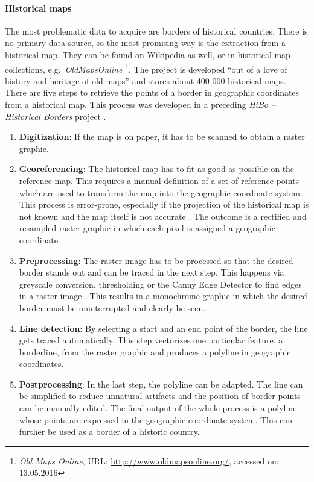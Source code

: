\paragraph{Historical maps} %
\label{par:historical_map}

The most problematic data to acquire are borders of historical countries. There is no primary data source, so the most promising way is the extraction from a historical map. They can be found on Wikipedia as well, or in historical map collections, e.g.\ \emph{OldMapsOnline}
\footnote{
  \textit{Old Maps Online},
  URL: \url{http://www.oldmapsonline.org/},
  accessed on: 13.05.2016
}.
The project is developed ``out of a love of history and heritage of old maps'' and stores about 400 000 historical maps.
There are five steps to retrieve the points of a border in geographic coordinates from a historical map. This process was developed in a preceding \emph{HiBo -- Historical Borders} project \cite{hibo}.

\begin{enumerate}
  \item \textbf{Digitization}: If the map is on paper, it has to be scanned to obtain a raster graphic.
  \item \textbf{Georeferencing}: The historical map has to fit as good as possible on the reference map. This requires a manual definition of a set of reference points which are used to transform the map into the geographic coordinate system. This process is error-prone, especially if the projection of the historical map is not known and the map itself is not accurate
  \cite{knowles2002past}.
  The outcome is a rectified and resampled raster graphic in which each pixel is assigned a geographic coordinate.
  \item \textbf{Preprocessing}: The raster image has to be processed so that the desired border stands out and can be traced in the next step. This happens via greyscale conversion, thresholding or the Canny Edge Detector to find edges in a raster image \cite{canny}. This results in a monochrome graphic in which the desired border must be uninterrupted and clearly be seen.
  \item \textbf{Line detection}: By selecting a start and an end point of the border, the line gets traced automatically. This step vectorizes one particular feature, a borderline, from the raster graphic and produces a polyline in geographic coordinates.
  \item \textbf{Postprocessing}: In the last step, the polyline can be adapted. The line can be simplified to reduce unnatural artifacts and the position of border points can be manually edited. The final output of the whole process is a polyline whose points are expressed in the geographic coordinate system. This can further be used as a border of a historic country.
\end{enumerate}

